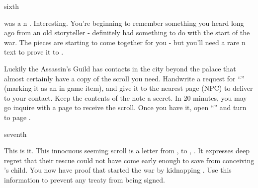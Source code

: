 \documentclass[greennotebook]{NeptuneBall}
\begin{document}
\begin{page}{sixth}

\cMother{} was a \pPacifica{}n \cMother{\prince}. Interesting. You're beginning to remember something you heard long ago from an old storyteller - \cMother{} definitely had something to do with the start of the war. The pieces are starting to come together for you - but you'll need a rare \pPacifica{}n text to prove it to \cPrince{}.

Luckily the Assassin's Guild has contacts in the city beyond the palace that almost certainly have a copy of the scroll you need. Handwrite a request for ``\iScroll{}'' (marking it as an in game item), and give it to the nearest page (NPC) to deliver to your contact. Keep the contents of the note a secret. In 20 minutes, you may go inquire with a page to receive the scroll. Once you have it, open ``\iScroll{}'' and turn to page .

\end{page}

\begin{page}{seventh}

This is it. This innocuous seeming scroll is a letter from \cMotherBrother{\prince} \cMotherBrother{}, to \cMotherBrother{\their} \cMother{\sibling}, \cMother{\prince} \cMother{}. It expresses \cMotherBrother{\their} deep regret that their rescue could not have come early enough to save \cMother{} from conceiving \cExExKing{}'s child. You now have proof that \pAtlantis{} started the war by kidnapping \cMother{\prince} \cMother{}. Use this information to prevent any treaty from being signed.

\end{page}

\endnotebook
\end{document}
